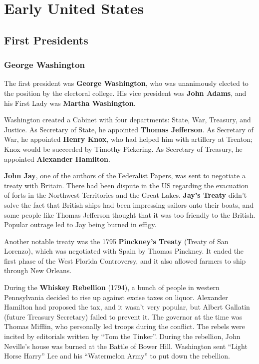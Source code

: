 \chapter{Early United States}

\section{First Presidents}

\subsection*{George Washington}

The first president was \textbf{George Washington},
who was unanimously elected to the position by the electoral college.
His vice president was \textbf{John Adams},
and his First Lady was \textbf{Martha Washington}.

Washington created a Cabinet with four departments: State, War, Treasury, and Justice.
As Secretary of State, he appointed \textbf{Thomas Jefferson}.
As Secretary of War, he appointed \textbf{Henry Knox},
who had helped him with artillery at Trenton;
Knox would be succeeded by Timothy Pickering.
As Secretary of Treasury, he appointed \textbf{Alexander Hamilton}.

\textbf{John Jay}, one of the authors of the Federalist Papers, was sent to negotiate a treaty with Britain.
There had been dispute in the US regarding the evacuation of forts in the Northwest Territories and the Great Lakes.
\textbf{Jay's Treaty} didn't solve the fact that British ships had been impressing sailors onto their boats,
and some people like Thomas Jefferson thought that it was too friendly to the British.
Popular outrage led to Jay being burned in effigy.

Another notable treaty was the 1795 \textbf{Pinckney's Treaty} (Treaty of San Lorenzo),
which was negotiated with Spain by Thomas Pinckney.
It ended the first phase of the West Florida Controversy,
and it also allowed farmers to ship through New Orleans.

During the \textbf{Whiskey Rebellion} (1794),
a bunch of people in western Pennsylvania decided to rise up against excise taxes on liquor.
Alexander Hamilton had proposed the tax, and it wasn't very popular,
but Albert Gallatin (future Treasury Secretary) failed to prevent it.
The governor at the time was Thomas Mifflin, who personally led troops during the conflict.
The rebels were incited by editorials written by ``Tom the Tinker''.
During the rebellion, John Neville's house was burned at the Battle of Bower Hill.
Washington sent ``Light Horse Harry'' Lee and his ``Watermelon Army'' to put down the rebellion.


